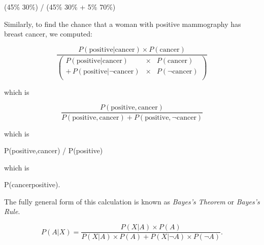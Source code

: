 {\centering
 (45\% {\texttimes} 30\%) / (45\% {\texttimes} 30\% + 5\%
{\texttimes} 70\%)
\par}


\bigskip

{
 Similarly, to find the chance that a woman with positive
mammography has breast cancer, we computed:}

\begin{equation*}
  \frac{P(\mathrm{positive}|\mathrm{cancer})\times P(\mathrm{cancer})}
       {\left(\begin{array}{rcl}
           P(\mathrm{positive}|\mathrm{cancer}) & \times & P(\mathrm{cancer}) \\
           +\, P(\mathrm{positive}|\lnot \mathrm{cancer}) & \times & P(\lnot \mathrm{cancer}) \\
         \end{array}
         \right)}
\end{equation*}


\bigskip

{
 which is}

\begin{equation*}
  \frac{P(\mathrm{positive},\mathrm{cancer})}
  {P(\mathrm{positive},\mathrm{cancer}) + P(\mathrm{positive},\lnot\mathrm{cancer})}
\end{equation*}


\bigskip

{
 which is}

{\centering
 P(positive,cancer) / P(positive)
\par}


\bigskip

{
 which is}

{\centering
 P(cancer{\textbar}positive).
\par}


\bigskip

{
 The fully general form of this calculation is known as
\textit{Bayes's Theorem} or
\textit{Bayes's Rule}.}

{\centering
{}
 
\par}


\bigskip

\begin{equation*}
  P(A|X) = \frac{P(X|A) \times P(A)}
  {P(X|A) \times P(A) + P(X|\lnot A)\times P(\lnot A)} .
\end{equation*}


\bigskip

